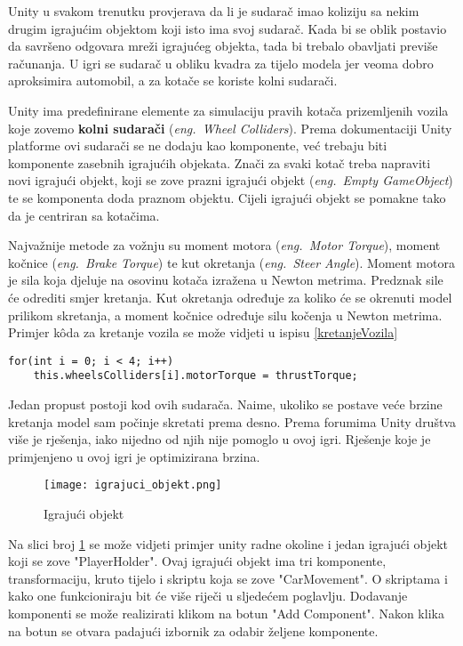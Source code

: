 Unity u svakom trenutku provjerava da li je sudarač imao koliziju sa nekim drugim igrajućim objektom koji isto ima svoj sudarač. Kada bi se oblik postavio da savršeno odgovara mreži igrajućeg objekta, tada bi trebalo obavljati previše računanja. U igri se sudarač u obliku kvadra za tijelo modela jer veoma dobro aproksimira automobil, a za kotače se koriste kolni sudarači.

Unity ima predefinirane elemente za simulaciju pravih kotača prizemljenih vozila koje zovemo \textbf{kolni sudarači} (\emph{eng.~Wheel Colliders}). Prema dokumentaciji Unity platforme ovi sudarači se ne dodaju kao komponente, već trebaju biti komponente zasebnih igrajućih objekata. Znači za svaki kotač treba napraviti novi igrajući objekt, koji se zove prazni igrajući objekt (\emph{eng.~Empty GameObject}) te se komponenta doda praznom objektu. Cijeli igrajući objekt se pomakne tako da je centriran sa kotačima.

Najvažnije metode za vožnju su moment motora (\emph{eng.~Motor Torque}), moment kočnice (\emph{eng.~Brake Torque}) te kut okretanja (\emph{eng.~Steer Angle}). Moment motora je sila koja djeluje na osovinu kotača izražena u Newton metrima. Predznak sile će odrediti smjer kretanja. Kut okretanja određuje za koliko će se okrenuti model prilikom skretanja, a moment kočnice određuje silu kočenja u Newton metrima. Primjer k\^oda za kretanje vozila se može vidjeti u ispisu \ref{kretanjeVozila}

\begin{lstlisting}[caption={Skripta za kretanje vozila}, label=kretanjeVozila]
for(int i = 0; i < 4; i++)
    this.wheelsColliders[i].motorTorque = thrustTorque;
\end{lstlisting}

Jedan propust postoji kod ovih sudarača. Naime, ukoliko se postave veće brzine kretanja model sam počinje skretati prema desno. Prema forumima Unity društva više je rješenja, iako nijedno od njih nije pomoglo u ovoj igri. Rješenje koje je primjenjeno u ovoj igri je optimizirana brzina.

\begin{figure}[h]
	\texttt{[image: igrajuci\_objekt.png]}
	\centering
	\caption{Igrajući objekt}
	\label{fig:igrajuciobjekt}
\end{figure}
\newpage
Na slici broj \ref{fig:igrajuciobjekt} se može vidjeti primjer unity radne okoline i jedan igrajući objekt koji se zove "PlayerHolder". Ovaj igrajući objekt ima tri komponente, transformaciju, kruto tijelo i skriptu koja se zove "CarMovement". O skriptama i kako one funkcioniraju bit će više riječi u sljedećem poglavlju. Dodavanje komponenti se može realizirati klikom na botun "Add Component". Nakon klika na botun se otvara padajući izbornik za odabir željene komponente.

